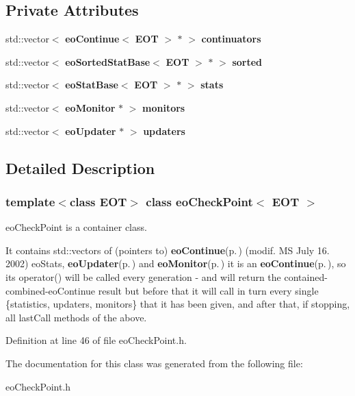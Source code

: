 \subsection*{Private Attributes}
\begin{CompactItemize}
\item 
std::vector$<$ {\bf eo\-Continue}$<$ {\bf EOT} $>$ $\ast$ $>$ {\bf continuators}\label{classeo_check_point_r0}

\item 
std::vector$<$ {\bf eo\-Sorted\-Stat\-Base}$<$ {\bf EOT} $>$ $\ast$ $>$ {\bf sorted}\label{classeo_check_point_r1}

\item 
std::vector$<$ {\bf eo\-Stat\-Base}$<$ {\bf EOT} $>$ $\ast$ $>$ {\bf stats}\label{classeo_check_point_r2}

\item 
std::vector$<$ {\bf eo\-Monitor} $\ast$ $>$ {\bf monitors}\label{classeo_check_point_r3}

\item 
std::vector$<$ {\bf eo\-Updater} $\ast$ $>$ {\bf updaters}\label{classeo_check_point_r4}

\end{CompactItemize}


\subsection{Detailed Description}
\subsubsection*{template$<$class EOT$>$ class eo\-Check\-Point$<$ EOT $>$}

eo\-Check\-Point is a container class. 

It contains std::vectors of (pointers to) {\bf eo\-Continue}{\rm (p.\,\pageref{classeo_continue})} (modif. MS July 16. 2002) eo\-Stats, {\bf eo\-Updater}{\rm (p.\,\pageref{classeo_updater})} and {\bf eo\-Monitor}{\rm (p.\,\pageref{classeo_monitor})} it is an {\bf eo\-Continue}{\rm (p.\,\pageref{classeo_continue})}, so its operator() will be called every generation - and will return the contained-combined-eo\-Continue result but before that it will call in turn every single \{statistics, updaters, monitors\} that it has been given, and after that, if stopping, all last\-Call methods of the above. 



Definition at line 46 of file eo\-Check\-Point.h.

The documentation for this class was generated from the following file:\begin{CompactItemize}
\item 
eo\-Check\-Point.h\end{CompactItemize}
